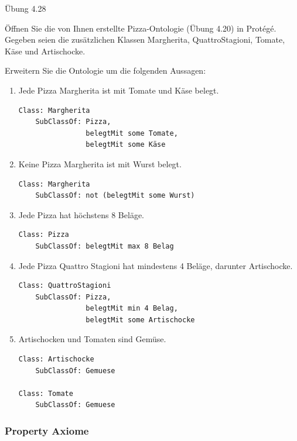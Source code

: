 \documentclass[a4paper]{article}
\begin{document}

Übung 4.28

Öffnen Sie die von Ihnen erstellte Pizza-Ontologie (Übung 4.20) in Protégé. Gegeben seien die zusätzlichen Klassen Margherita, QuattroStagioni, Tomate, Käse und Artischocke.

Erweitern Sie die Ontologie um die folgenden Aussagen:

\begin{enumerate}
    \item Jede Pizza Margherita ist mit Tomate und Käse belegt.
    
\begin{lstlisting}
Class: Margherita
    SubClassOf: Pizza,
                belegtMit some Tomate,
                belegtMit some Käse
\end{lstlisting}
    \item Keine Pizza Margherita ist mit Wurst belegt.
    
\begin{lstlisting}
Class: Margherita
    SubClassOf: not (belegtMit some Wurst)
\end{lstlisting}
    \item Jede Pizza hat höchstens 8 Beläge.
    
\begin{lstlisting}
Class: Pizza
    SubClassOf: belegtMit max 8 Belag
\end{lstlisting}
    \item Jede Pizza Quattro Stagioni hat mindestens 4 Beläge, darunter Artischocke.
    
\begin{lstlisting}
Class: QuattroStagioni
    SubClassOf: Pizza,
                belegtMit min 4 Belag,
                belegtMit some Artischocke
\end{lstlisting}
    \item Artischocken und Tomaten sind Gemüse.
    
\begin{lstlisting}
Class: Artischocke
    SubClassOf: Gemuese

Class: Tomate
    SubClassOf: Gemuese
\end{lstlisting}
\end{enumerate}

\subsubsection{Property Axiome}
\end{document}

